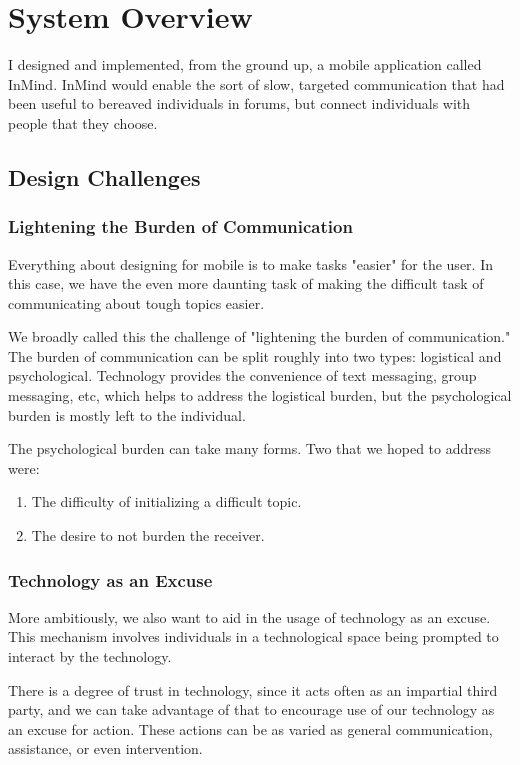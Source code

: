 \chapter{System Overview}
  I designed and implemented,
  from the ground up, a mobile application called InMind.
  InMind would enable the sort of slow,
  targeted communication that had been useful to bereaved individuals in forums,
  but connect individuals with people that they choose.

  \section{Design Challenges}
    \subsection{Lightening the Burden of Communication}
    Everything about designing for mobile is to make tasks "easier" for the user.
    In this case, we have the even more daunting task of making
    the difficult task of communicating about tough topics easier.

    We broadly called this the challenge of "lightening the burden of communication."
    The burden of communication can be split roughly into two types:
    logistical and psychological.
    Technology provides the convenience of text messaging,
    group messaging, etc, which helps to address the logistical burden,
    but the psychological burden is mostly left to the individual.

    The psychological burden can take many forms.
    Two that we hoped to address were:
    \begin{enumerate}
    \item The difficulty of initializing a difficult topic.
    \item The desire to not burden the receiver.
    \end{enumerate}

    \subsection{Technology as an Excuse}
    More ambitiously, we also want to aid in the usage of technology as an excuse.
    This mechanism involves individuals in a technological space being prompted
    to interact by the technology.
    
    There is a degree of trust in technology, since it acts often as an impartial third party,
    and we can take advantage of that to encourage use of our technology as an excuse for action.
    These actions can be as varied as 
    general communication,
    assistance, or even intervention.

